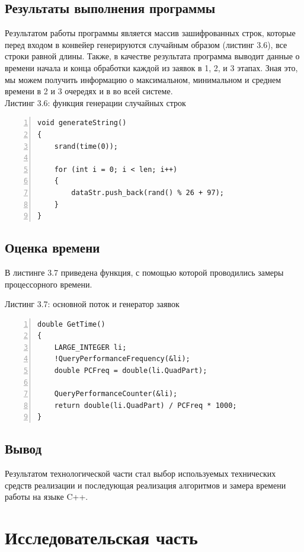 \documentclass[12pt,a4paper]{report}
\begin{document}
\section{Результаты выполнения программы}

Результатом работы программы является массив зашифрованных строк, которые перед входом в конвейер
генерируются случайным образом (листинг 3.6), все строки равной длины.
Также, в качестве результата программа выводит данные о времени начала и конца обработки каждой 
из заявок в 1, 2, и 3 этапах. 
Зная это, мы можем получить информацию о максимальном, минимальном и среднем времени в 2 и 3 очередях
 и в во всей системе. \\

\textrm{Листинг 3.6: функция генерации случайных строк}
\begin{lstlisting}[frame=single, numbers=left]
void generateString()
{
    srand(time(0));

    for (int i = 0; i < len; i++)
    {
        dataStr.push_back(rand() % 26 + 97);
    }
}
\end{lstlisting}

\section{Оценка времени}

В листинге 3.7 приведена функция, с помощью которой проводились замеры процессорного времени.

\textrm{Листинг 3.7: основной поток и генератор заявок}
\begin{lstlisting}[frame=single, numbers=left]
double GetTime()
{
    LARGE_INTEGER li;
    !QueryPerformanceFrequency(&li);
    double PCFreq = double(li.QuadPart);

    QueryPerformanceCounter(&li);
    return double(li.QuadPart) / PCFreq * 1000;
}
\end{lstlisting}

\section{Вывод}

Результатом технологической части стал выбор используемых технических средств реализации и последующая 
реализация алгоритмов и замера времени работы на языке C++.

\chapter{Исследовательская часть}
\end{document}
